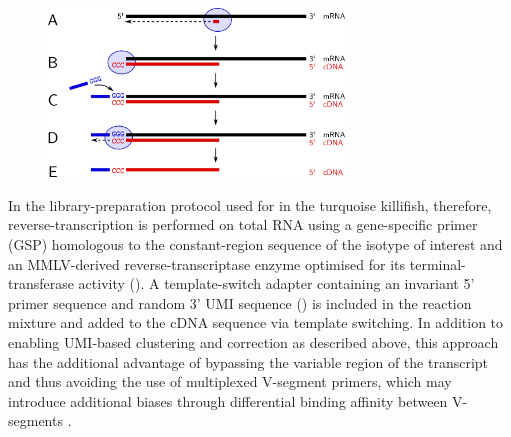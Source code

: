 \begin{figure}
\centering
\includegraphics[width=0.7\textwidth]{_Figures/png_edited/template-switch-labelled}
\vspace{0.5em}
\label{fig:template-switch-schema}
\end{figure}

In the library-preparation protocol used for \Igseq in the turquoise killifish, therefore, reverse-transcription is performed on total RNA using a gene-specific primer (GSP) homologous to the constant-region sequence of the isotype of interest and an MMLV-derived reverse-transcriptase enzyme optimised for its terminal-transferase activity (). A template-switch adapter containing an invariant 5' primer sequence and random 3' UMI sequence () is included in the reaction mixture and added to the cDNA sequence via template switching. In addition to enabling UMI-based clustering and correction as described above, this approach has the additional advantage of bypassing the variable region of the \igh{} transcript and thus avoiding the use of multiplexed V-segment primers, which may introduce additional biases through differential binding affinity between V-segments \parencite{rosati2017methods}.

